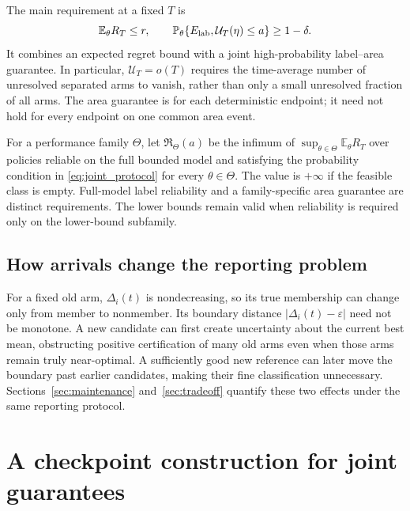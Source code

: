 \documentclass[11pt]{article}
\theoremstyle{remark}
\newcommand{\E}{\mathbb E}
\newcommand{\Prob}{\mathbb P}
\begin{document}
The main requirement at a fixed $T$ is
\begin{equation}
 \E_\theta R_T\le r,\qquad
 \Prob_\theta\{E_{\rm lab},\mathcal U_T(\eta)\le a\}\ge1-\delta.
 \label{eq:joint_protocol}
\end{equation}
It combines an expected regret bound with a joint high-probability
label--area guarantee. In particular, $\mathcal U_T=o(T)$ requires the
time-average number of unresolved separated arms to vanish, rather than
only a small unresolved fraction of all arms. The area guarantee is for
each deterministic endpoint; it need not hold for every endpoint on one
common area event.

For a performance family $\Theta$, let $\mathfrak R_\Theta(a)$ be the
infimum of $\sup_{\theta\in\Theta}\E_\theta R_T$ over policies reliable on
the full bounded model and satisfying the probability condition in
\eqref{eq:joint_protocol} for every $\theta\in\Theta$. The value is
$+\infty$ if the feasible class is empty. Full-model label reliability
and a family-specific area guarantee are distinct requirements. The
lower bounds remain valid when reliability is required only on the
lower-bound subfamily.

\subsection{How arrivals change the reporting problem}

For a fixed old arm, $\Delta_i(t)$ is nondecreasing, so its true membership
can change only from member to nonmember. Its boundary distance
$|\Delta_i(t)-\varepsilon|$ need not be monotone. A new candidate can first
create uncertainty about the current best mean, obstructing positive
certification of many old arms even when those arms remain truly
near-optimal. A sufficiently good new reference can later move the
boundary past earlier candidates, making their fine classification
unnecessary. Sections~\ref{sec:maintenance} and~\ref{sec:tradeoff} quantify
these two effects under the same reporting protocol.

\section{A checkpoint construction for joint guarantees}
\label{sec:method}
\end{document}
